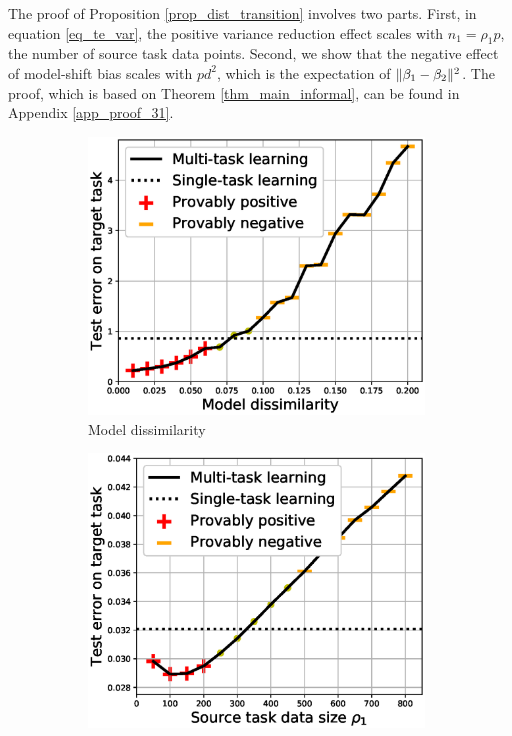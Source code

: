 The proof of Proposition \ref{prop_dist_transition} involves two parts.
First, in equation \eqref{eq_te_var}, the positive variance reduction effect scales with $n_1 = \rho_1 p$, the number of source task data points.
Second, we show that the negative effect of model-shift bias scales with $pd^2$, which is the expectation of $\|\beta_1 - \beta_2\|^2$.
The proof, which is based on Theorem \ref{thm_main_informal}, can be found in Appendix \ref{app_proof_31}. %

\begin{figure}
	\begin{subfigure}[b]{0.32\textwidth}
		\centering
		\includegraphics[width=0.98\textwidth]{figures/model_shift_phase_transition.eps}
		\caption{Model dissimilarity}
		\label{fig_model_shift}
	\end{subfigure}\hfill
	\begin{subfigure}[b]{0.32\textwidth}
		\centering
		\includegraphics[width=0.98\textwidth]{figures/datapoints_phase_transition.eps}

\end{subfigure}
\end{figure}
